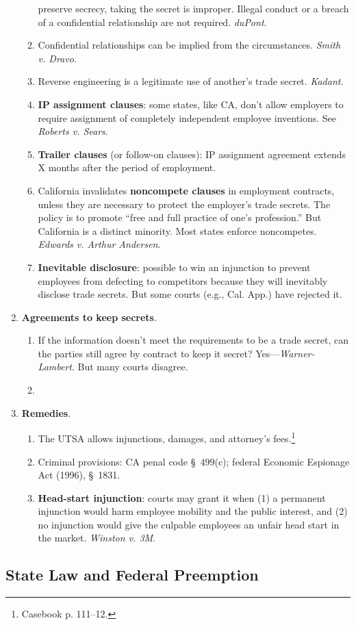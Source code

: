 \begin{enumerate}
\begin{enumerate}
        preserve secrecy, taking the secret is improper. Illegal conduct or a 
        breach of a confidential relationship are not required. \emph{duPont}.
        \item Confidential relationships can be implied from the 
        circumstances. \emph{Smith v. Dravo}.
        \item Reverse engineering is a legitimate use of another's trade 
        secret. \emph{Kadant}.
        \item \textbf{IP assignment clauses}: some states, like CA, don't 
        allow employers to require assignment of completely independent 
        employee inventions. See \emph{Roberts v. Sears}.
        \item \textbf{Trailer clauses} (or follow-on clauses): IP assignment 
        agreement extends X months after the period of employment.
        \item California invalidates \textbf{noncompete clauses} in employment 
        contracts, unless they are necessary to protect the employer's trade 
        secrets. The policy is to promote ``free and full practice of one's 
        profession.'' But California is a distinct minority. Most states 
        enforce noncompetes. \emph{Edwards v. Arthur Andersen}.
        \item \textbf{Inevitable disclosure}: possible to win an injunction to 
        prevent employees from defecting to competitors because they will 
        inevitably disclose trade secrets. But some courts (e.g., Cal. App.) 
        have rejected it.
    \end{enumerate}
    \item \textbf{Agreements to keep secrets}.
    \begin{enumerate}
        \item If the information doesn't meet the requirements to be a trade 
        secret, can the parties still agree by contract to keep it secret?  
        Yes---\emph{Warner-Lambert}. But many courts disagree.
        \item 
    \end{enumerate}
    \item \textbf{Remedies}.
    \begin{enumerate}
        \item The UTSA allows injunctions, damages, and attorney's 
        fees.\footnote{Casebook p. 111--12.}
        \item Criminal provisions: CA penal code \S\ 499(c); federal Economic 
        Espionage Act (1996), \S\ 1831.
        \item \textbf{Head-start injunction}: courts may grant it when (1) a 
        permanent injunction would harm employee mobility and the public 
        interest, and (2) no injunction would give the culpable employees an 
        unfair head start in the market. \emph{Winston v. 3M}.
    \end{enumerate}
\end{enumerate}

\newpage

\subsection{State Law and Federal Preemption}

